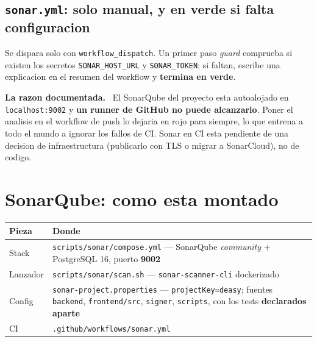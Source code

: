 \documentclass[11pt,a4paper,oneside]{report}
\newenvironment{nota}[1][Nota]{%
  \par\medskip
  \colorlet{shadecolor}{black!6}%
  \begin{shaded}\noindent\textbf{#1.}\ \ignorespaces}%
  {\end{shaded}\par\medskip}
\newcommand{\rt}[1]{\texttt{#1}}
\begin{document}
\subsection{\rt{sonar.yml}: solo manual, y en verde si falta configuracion}

Se dispara solo con \rt{workflow\_dispatch}. Un primer paso \emph{guard} comprueba si existen
los secretos \rt{SONAR\_HOST\_URL} y \rt{SONAR\_TOKEN}; si faltan, escribe una explicacion en el
resumen del workflow y \textbf{termina en verde}.

\begin{nota}[La razon documentada]
El SonarQube del proyecto esta autoalojado en \rt{localhost:9002} y \textbf{un runner de GitHub
no puede alcanzarlo}. Poner el analisis en el workflow de push lo dejaria en rojo para siempre,
lo que entrena a todo el mundo a ignorar los fallos de CI. Sonar en CI esta pendiente de una
decision de infraestructura (publicarlo con TLS o migrar a SonarCloud), no de codigo.
\end{nota}

\section{SonarQube: como esta montado}

\begin{center}
\footnotesize
\begin{tabularx}{\textwidth}{@{}P{2.6cm}L@{}}
\toprule
\textbf{Pieza} & \textbf{Donde} \\
\midrule
Stack     & \rt{scripts/sonar/compose.yml} --- SonarQube \emph{community} + PostgreSQL 16, puerto \textbf{9002} \\
Lanzador  & \rt{scripts/sonar/scan.sh} --- \rt{sonar-scanner-cli} dockerizado \\
Config    & \rt{sonar-project.properties} --- \rt{projectKey=deasy}; fuentes \rt{backend}, \rt{frontend/src}, \rt{signer}, \rt{scripts}, con los tests \textbf{declarados aparte} \\
CI        & \rt{.github/workflows/sonar.yml} \\
\bottomrule
\end{tabularx}
\end{center}
\end{document}
